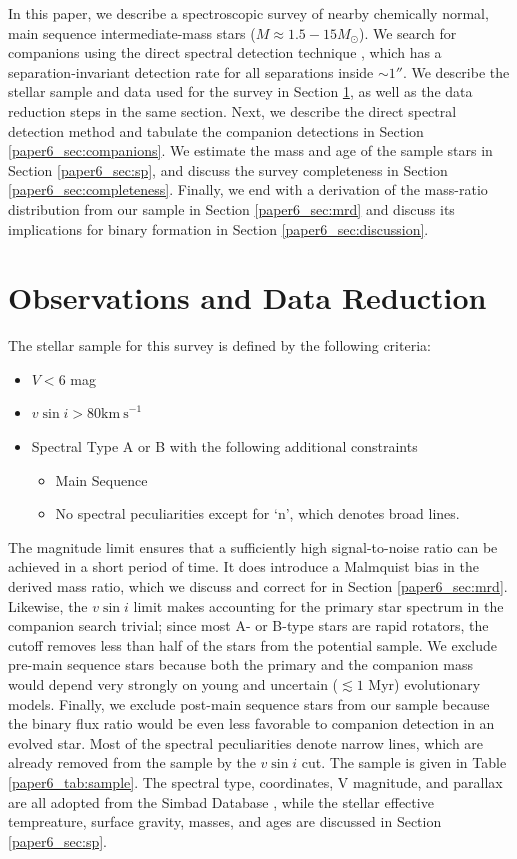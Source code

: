 In this paper, we describe a spectroscopic survey of nearby chemically normal, main sequence intermediate-mass stars ($M \approx 1.5 - 15 M_{\odot}$). We search for companions using the direct spectral detection technique \citep{Gullikson2016}, which has a separation-invariant detection rate for all separations inside $\sim 1 ''$. We describe the stellar sample and data used for the survey in Section \ref{paper6_sec:obs}, as well as the data reduction steps in the same section. Next, we describe the direct spectral detection method and tabulate the companion detections in Section \ref{paper6_sec:companions}. We estimate the mass and age of the sample stars in Section \ref{paper6_sec:sp}, and discuss the survey completeness in Section \ref{paper6_sec:completeness}. Finally, we end with a derivation of the mass-ratio distribution from our sample in Section \ref{paper6_sec:mrd} and discuss its implications for binary formation in Section \ref{paper6_sec:discussion}.
 


\section{Observations and Data Reduction}
\label{paper6_sec:obs}

The stellar sample for this survey is defined by the following criteria:

\begin{itemize}
\item $V < 6$ mag
\item $v\sin{i} > 80 \mathrm{km\ s}^{-1}$
\item Spectral Type A or B with the following additional constraints
\begin{itemize}
  \item Main Sequence
  \item No spectral peculiarities except for `n', which denotes broad lines.
\end{itemize}
\end{itemize}

The magnitude limit ensures that a sufficiently high signal-to-noise ratio can be achieved in a short period of time. It does introduce a Malmquist bias in the derived mass ratio, which we discuss and correct for in Section \ref{paper6_sec:mrd}. Likewise, the $v\sin{i}$ limit makes accounting for the primary star spectrum in the companion search trivial; since most A- or B-type stars are rapid rotators, the cutoff removes less than half of the stars from the potential sample. We exclude pre-main sequence stars because both the primary and the companion mass would depend very strongly on young and uncertain ($\lesssim 1$ Myr) evolutionary models. Finally, we exclude post-main sequence stars from our sample because the binary flux ratio would be even less favorable to companion detection in an evolved star. Most of the spectral peculiarities denote narrow lines, which are already removed from the sample by the $v\sin{i}$ cut. The sample is given in Table \ref{paper6_tab:sample}. The spectral type, coordinates, V magnitude, and parallax are all adopted from the Simbad Database \citep{Simbad}, while the stellar effective tempreature, surface gravity, masses, and ages are discussed in Section \ref{paper6_sec:sp}.

